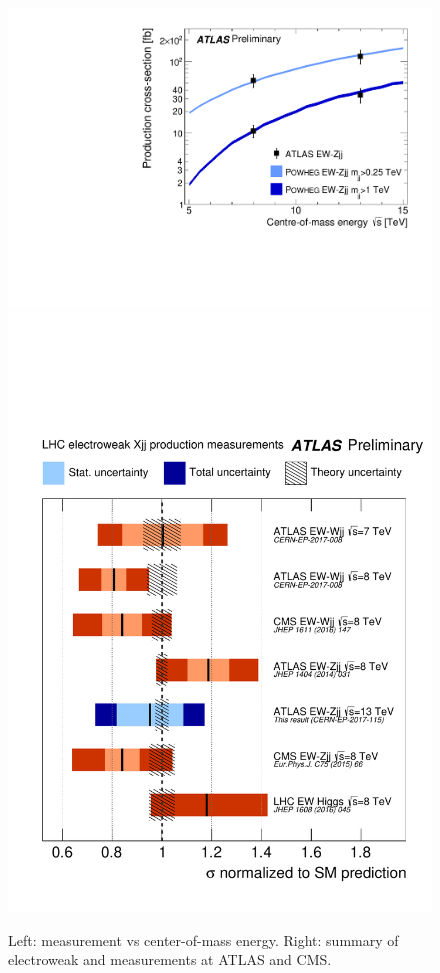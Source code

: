 \documentclass{PoS}
\begin{document}
\begin{figure}
  \includegraphics[width=.57\textwidth]{STDM-2016-09/fig_06.pdf}
  \includegraphics[width=.42\textwidth]{STDM-2016-09/fig_09.pdf}
  \caption{Left: \zjj measurement vs center-of-mass energy. Right: summary of electroweak \wjj and \zjj
measurements at ATLAS and CMS.}
  \label{zjj-wjj-summary-results}
\end{figure}




\end{document}
